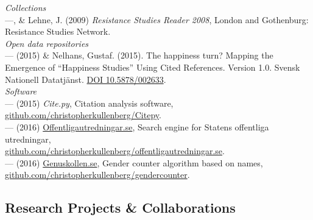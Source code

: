 \documentclass[a4paper,11pt,oneside]{article}
\begin{document}
{    \noindent \emph{Collections}\\
      ---, \& Lehne, J. (2009) \emph{Resistance Studies Reader 2008}, London and Gothenburg: Resistance Studies Network.\\

    \noindent \emph{Open data repositories}\\
    --- (2015) \& Nelhans, Gustaf. (2015). The happiness turn? Mapping the
    Emergence of “Happiness Studies” Using Cited References. Version 1.0. Svensk
    Nationell Datatjänst. \href{http://dx.doi.org/10.5878/002633}{DOI 10.5878/002633}.
    \\

    \noindent \emph{Software}\\
    --- (2015) \emph{Cite.py}, Citation analysis software, \href{https://github.com/christopherkullenberg/Citepy}{github.com/christopherkullenberg/Citepy}.\\
    --- (2016) \href{http://offentligautredningar.se}{Offentligautredningar.se}, Search engine for Statens offentliga utredningar,\\ \href{https://github.com/christopherkullenberg/offentligautredningar.se}{github.com/christopherkullenberg/offentligautredningar.se}. \\
    --- (2016) \href{https://genuskollen.se}{Genuskollen.se}, Gender counter algorithm based on names,\\ \href{https://github.com/christopherkullenberg/gendercounter}{github.com/christopherkullenberg/gendercounter}. \\



\subsection{Research Projects \& Collaborations}

}
\end{document}
